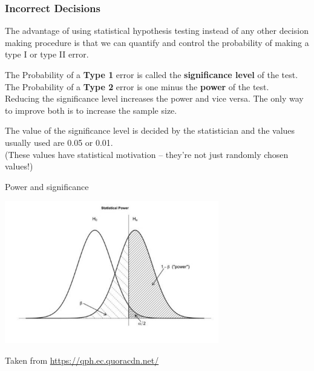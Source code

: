 \documentclass[12pt,xcolor=dvipsnames,handout,mathserif,aspectratio=169]{beamer}
\newcommand{\bbl}[1]{{\color{NavyBlue} \textbf{#1}}}
\newcommand{\bre}[1]{{\color{red} \textbf{#1}}}
\newcommand{\bgr}[1]{{\color{PineGreen} \textbf{#1}}}
\begin{document}
\begin{frame}
\frametitle{Incorrect Decisions}
The advantage of using statistical hypothesis testing instead of any other decision making procedure is that we can quantify and control the probability of making a type I or type II error.

\vspace*{0.5cm}
The Probability of a \bbl{Type 1} error is called the \bgr{significance level} of the test.\\
The Probability of a \bbl{Type 2} error is one minus the \bre{power} of the test.\\

\vspace*{0.5cm}
Reducing the significance level increases the power and vice versa. The only way to improve both is to increase the sample size.

\vspace*{0.5cm}
The value of the significance level is decided by the statistician and the values usually used are 0.05 or 0.01.\\
\vspace*{0.5cm}
(These values have statistical motivation -- they're not just randomly chosen values!)
\end{frame}

\begin{frame}{Power and significance}

\centering \includegraphics[width=0.7\textwidth]{Power.pdf}

\tiny
Taken from \url{https://qph.ec.quoracdn.net/}
\end{frame}
\end{document}
